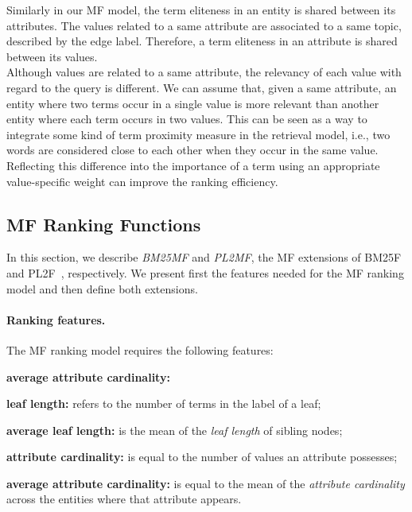 Similarly in our MF model, the term eliteness in an entity is shared between its attributes. The values related to a same attribute are associated to a same topic, described by the edge label. Therefore, a term eliteness in an attribute is shared between its values.\\

Although values are related to a same attribute, the relevancy of each value with regard to the query is different. We can assume that, given a same attribute, an entity where two terms occur in a single value is more relevant than another entity where each term occurs in two values. This can be seen as a way to integrate some kind of term proximity measure in the retrieval model, i.e., two words are considered close to each other when they occur in the same value. Reflecting this difference into the importance of a term using an appropriate value-specific weight can improve the ranking efficiency.

\subsection{MF Ranking Functions}
\label{sec:mf-function}

In this section, we describe \emph{BM25MF} and \emph{PL2MF}, the MF extensions of BM25F~\cite{zaragoza:2004:microsoft} and PL2F~\cite{macdonald:2005:clef}, respectively.
We present first the features needed for the MF ranking model and then define both extensions.

\paragraph{Ranking features.}

The MF ranking model requires the following features:
\begin{labeling}{\textbf{average attribute cardinality:}}
  \item[\textbf{leaf length:}] refers to the number of terms in the label of a leaf;
  \item[\textbf{average leaf length:}] is the mean of the \emph{leaf length} of sibling nodes;
  \item[\textbf{attribute cardinality:}] is equal to the number of values an attribute possesses;
  \item[\textbf{average attribute cardinality:}] is equal to the mean of the \emph{attribute cardinality} across the entities where that attribute appears.
\end{labeling}

